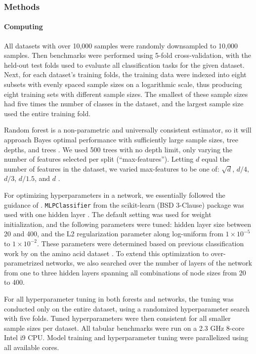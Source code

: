 \subsubsection{Methods}
\paragraph{Computing}
All datasets with over 10,000 samples were randomly downsampled to 10,000 samples. Then benchmarks were performed using 5-fold cross-validation, with the held-out test folds used to evaluate all classification tasks for the given dataset.
Next, for each dataset's training folds, the training data were indexed into eight subsets with evenly spaced sample sizes on a logarithmic scale, thus producing eight training sets with different sample sizes. The smallest of these sample sizes had five times the number of classes in the dataset, and the largest sample size used the entire training fold.

Random forest is a non-parametric and universally consistent estimator, so it will approach Bayes optimal performance with sufficiently large sample sizes, tree depths, and trees \citep{biau}.
We used 500 trees with no depth limit, only varying the number of features selected per split (``max-features'').
Letting $d$ equal the number of features in the dataset, we varied max-features to be one of: $\sqrt{d}$, $d/4$, $d/3$, $d/1.5$, and $d$ \citep{Probst2019}.

For optimizing hyperparameters in a network, we essentially followed the guidance of \citet{bouthillier}. \texttt{MLPClassifier} from the scikit-learn (BSD 3-Clause) package was used with one hidden layer \citep{scikit-learn}. The default setting was used for weight initialization, and the following parameters were tuned: hidden layer size between 20 and 400, and the L2 regularization parameter along log-uniform from $1 \times 10^{-5}$ to $1 \times 10^{-2}$. These parameters were determined based on previous classification work by \citet{jurtz} on the amino acid dataset \citep{MHC}.
To extend this optimization to over-parametrized networks, we also searched over the number of layers of the network from one to three hidden layers spanning all combinations of node sizes from 20 to 400. 

For all hyperparameter tuning in both forests and networks, the tuning was conducted only on the entire dataset, using a randomized hyperparameter search with five folds. Tuned hyperparameters were then consistent for all smaller sample sizes per dataset. All tabular benchmarks were run on a 2.3 GHz 8-core Intel i9 CPU. Model training and hyperparameter tuning were parallelized using all available cores.


